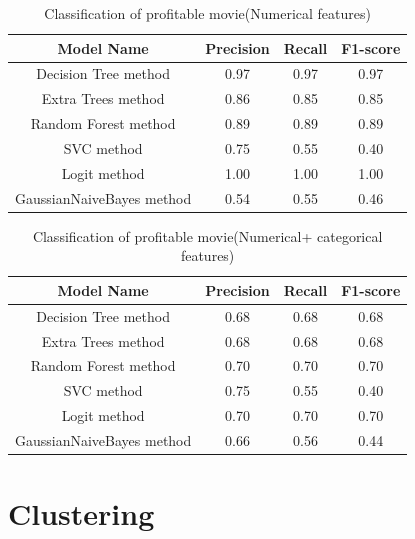 \documentclass{article}%
\begin{document}
\begin{table}[tb]
\caption{Classification of profitable movie(Numerical features)}
\label{tab:Classification_of_profit_movie}
\begin{center}
\footnotesize
\begin{tabular}{|c|c|c|c|} \hline
\textbf{Model Name}& \textbf{Precision}& \textbf{Recall} & \textbf{F1-score }   \\ \hline \hline
Decision Tree method & 0.97 &	0.97 &	0.97 \\ \hline
Extra Trees method & 0.86	& 0.85 &	0.85\\ \hline
Random Forest method & 0.89 &	0.89	&0.89\\ \hline
SVC method & 0.75 &	0.55	& 0.40\\ \hline
Logit method &  1.00	 &1.00	& 1.00\\ \hline
GaussianNaiveBayes method & 0.54	& 0.55	& 0.46\\ \hline
\end{tabular}
\end{center}
\end{table}


\begin{table}[tb]
\caption{Classification of profitable movie(Numerical+ categorical features)}
\label{tab:Classification_of_profit_movie_NC}
\begin{center}
\footnotesize
\begin{tabular}{|c|c|c|c|} \hline
\textbf{Model Name}& \textbf{Precision}& \textbf{Recall} & \textbf{F1-score }   \\ \hline \hline
Decision Tree method & 0.68	& 0.68 &	0.68\\ \hline
Extra Trees method & 0.68 &	0.68	&0.68\\ \hline
Random Forest method & 0.70	 & 0.70 &	0.70\\ \hline
SVC method & 0.75 &	0.55	&0.40\\ \hline
Logit method& 0.70	& 0.70	&0.70\\ \hline
GaussianNaiveBayes method &  0.66	& 0.56 &	0.44\\ \hline

\end{tabular}
\end{center}
\end{table}

\section{Clustering}
\end{document}
